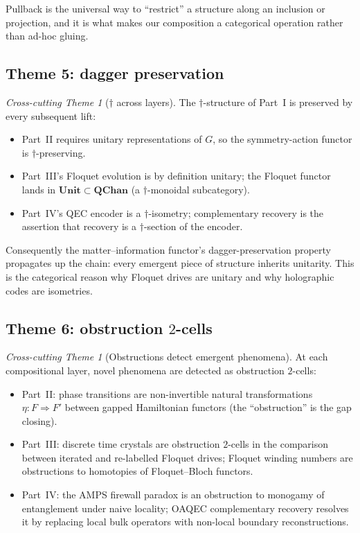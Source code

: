\documentclass[12pt]{article}
\theoremstyle{definition}
\theoremstyle{remark}
\newtheorem{theme}[theorem]{Cross-cutting Theme}
\newcommand{\QChan}{\mathbf{QChan}}
\begin{document}
Pullback is the universal way to ``restrict'' a structure along an
inclusion or projection, and it is what makes our composition a categorical
operation rather than ad-hoc gluing.

\subsection{Theme 5: dagger preservation}
\label{sec:theme-dagger}

\begin{theme}[$\dagger$ across layers]
\label{theme:dagger}
The $\dagger$-structure of Part~I is preserved by every subsequent lift:
\begin{itemize}[leftmargin=2em]
\item Part~II requires unitary representations of $G$, so the
  symmetry-action functor is $\dagger$-preserving.
\item Part~III's Floquet evolution is by definition unitary; the Floquet
  functor lands in $\mathbf{Unit} \subset \QChan$ (a $\dagger$-monoidal
  subcategory).
\item Part~IV's QEC encoder is a $\dagger$-isometry; complementary recovery
  is the assertion that recovery is a $\dagger$-section of the encoder.
\end{itemize}
\end{theme}

Consequently the matter--information functor's dagger-preservation
property propagates up the chain: every emergent piece of structure inherits
unitarity. This is the categorical reason why Floquet drives are unitary
and why holographic codes are isometries.

\subsection{Theme 6: obstruction $2$-cells}
\label{sec:theme-obstruction}

\begin{theme}[Obstructions detect emergent phenomena]
\label{theme:obstr}
At each compositional layer, novel phenomena are detected as obstruction
$2$-cells:
\begin{itemize}[leftmargin=2em]
\item Part~II: phase transitions are non-invertible natural transformations
  $\eta : F \Rightarrow F'$ between gapped Hamiltonian functors (the
  ``obstruction'' is the gap closing).
\item Part~III: discrete time crystals are obstruction $2$-cells in the
  comparison between iterated and re-labelled Floquet drives; Floquet
  winding numbers are obstructions to homotopies of Floquet--Bloch
  functors.
\item Part~IV: the AMPS firewall paradox is an obstruction to monogamy of
  entanglement under naive locality; OAQEC complementary recovery resolves
  it by replacing local bulk operators with non-local boundary
  reconstructions.
\end{itemize}
\end{theme}
\end{document}
